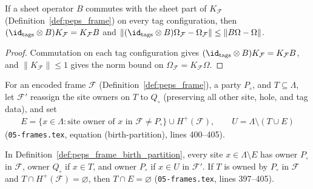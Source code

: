 \begin{lemma}
    \label{lem:peps_frame_pass_encoding}
    \leanok
    If a sheet operator $B$ commutes with the sheet part of $K_{\mathcal F}$
    (Definition~\ref{def:peps_frame}) on every tag configuration, then
    $(\id_{\rm tags}\otimes B)K_{\mathcal F}=K_{\mathcal F}B$ and
    $\lVert(\id_{\rm tags}\otimes B)\Omega_{\mathcal F}-\Omega_{\mathcal F}\rVert\le\lVert B\Omega-\Omega\rVert$.
\end{lemma}

\begin{proof}\leanok
    Commutation on each tag configuration gives
    $(\id_{\rm tags}\otimes B)K_{\mathcal F}=K_{\mathcal F}B$, and
    $\|K_{\mathcal F}\|\le 1$ gives the norm bound on
    $\Omega_{\mathcal F}=K_{\mathcal F}\Omega$.
\end{proof}

\begin{definition}
    \label{def:peps_frame_birth_partition}
    \leanok
    For an encoded frame $\mathcal F$ (Definition~\ref{def:peps_frame}), a
    party $P_\circ$, and $T\subseteq\Lambda$, let $\mathcal F'$ reassign the
    site owners on $T$ to $Q_\circ$ (preserving all other site, hole, and tag
    data), and set
    \begin{align}
        E=\{x\in\Lambda:\text{site owner of }x\text{ in }\mathcal F\neq P_\circ\}\cup H^+(\mathcal F),
        \qquad U=\Lambda\setminus(T\cup E)
        \label{eq:peps_frame_birth_partition}
    \end{align}
    (\texttt{05-frames.tex}, equation (birth-partition), lines 400--405).
\end{definition}

\begin{lemma}
    \label{lem:peps_frame_birth_partition_owners}
    \leanok
    In Definition~\ref{def:peps_frame_birth_partition}, every site
    $x\in\Lambda\setminus E$ has owner $P_\circ$ in $\mathcal F$, owner
    $Q_\circ$ if $x\in T$, and owner $P_\circ$ if $x\in U$ in $\mathcal F'$. If
    $T$ is owned by $P_\circ$ in $\mathcal F$ and $T\cap H^+(\mathcal F)=\varnothing$,
    then $T\cap E=\varnothing$ (\texttt{05-frames.tex}, lines 397--405).
\end{lemma}

